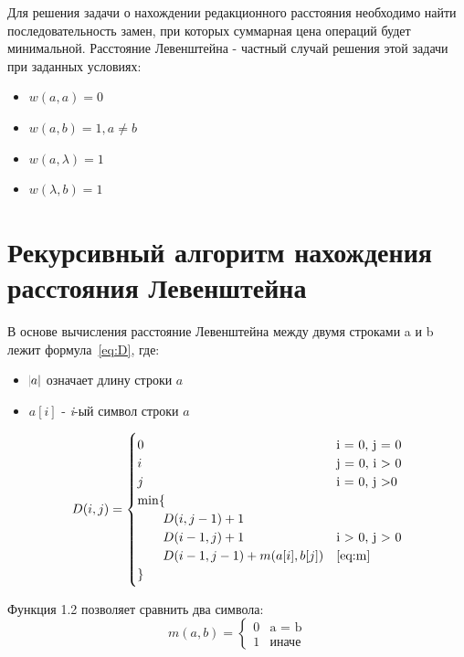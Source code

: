 \documentclass[12pt]{report}
\begin{document}
    Для решения задачи о нахождении редакционного расстояния необходимо найти последовательность замен, при которых
    суммарная цена операций будет минимальной. Расстояние Левенштейна - частный случай решения этой задачи
    при заданных условиях:
    \begin{itemize}
        \item $w(a, a) = 0$
        \item $w(a, b) = 1, a \neq b$
        \item $w(a, \lambda) = 1$
        \item $w(\lambda, b) = 1$
    \end{itemize}

    \section{Рекурсивный алгоритм нахождения расстояния Левенштейна}
    В основе вычисления расстояние Левенштейна между двумя строками a и b лежит формула~\ref{eq:D},
    где:
    \begin{itemize}
        \item $\abs{a}$ означает длину строки $a$
        \item $a[i]$ - \emph{i}-ый символ строки $a$
    \end{itemize}

    \begin{equation}
        \label{eq:D}
        D(i, j) = \begin{cases}
                      0 &\text{i = 0, j = 0} \\
                      i &\text{j = 0, i > 0} \\
                      j &\text{i = 0, j >0} \\
                      \min \lbrace \\
                      \qquad D(i, j - 1) + 1 \\
                      \qquad D(i - 1, j) + 1 &\text{i > 0, j > 0} \\
                      \qquad D(i - 1, j - 1) + m(a[i], b[j]) &\text{\ref{eq:m}} \\
                      \rbrace
        \end{cases}
    \end{equation}

    Функция 1.2 позволяет сравнить два символа:
    \begin{equation}
        \label{eq:m}
        m(a, b) = \begin{cases}
                      0 &\text{a = b} \\
                      1 &\text{иначе}
        \end{cases}
    \end{equation}
\end{document}
